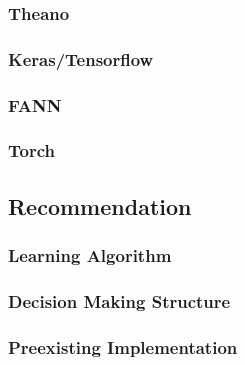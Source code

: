 \subsubsection{Theano}
\subsubsection{Keras/Tensorflow}
\subsubsection{FANN}
\subsubsection{Torch}

\subsection{Recommendation}
\subsubsection{Learning Algorithm}
\subsubsection{Decision Making Structure}
\subsubsection{Preexisting Implementation}


\newpage





